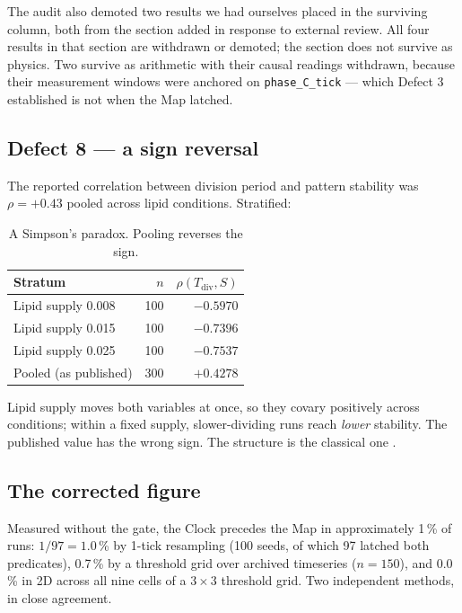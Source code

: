 \documentclass[11pt,letterpaper]{article}
\begin{document}
The audit also demoted two results we had ourselves placed in the
surviving column, both from the section added in response to external
review. All four results in that section are withdrawn or demoted; the
section does not survive as physics. Two survive as arithmetic with
their causal readings withdrawn, because their measurement windows were
anchored on \texttt{phase\_C\_tick} --- which Defect 3 established is not
when the Map latched.

\subsection{Defect 8 --- a sign reversal}

The reported correlation between division period and pattern stability
was $\rho = +0.43$ pooled across lipid conditions. Stratified:

\begin{table}[H]
\centering
\caption{A Simpson's paradox. Pooling reverses the sign.}
\label{tab:simpson}
\begin{tabular}{lrr}
\toprule
Stratum & $n$ & $\rho(T_{\mathrm{div}}, S)$ \\
\midrule
Lipid supply 0.008 & 100 & $-0.5970$ \\
Lipid supply 0.015 & 100 & $-0.7396$ \\
Lipid supply 0.025 & 100 & $-0.7537$ \\
\midrule
Pooled (as published) & 300 & $\mathbf{+0.4278}$ \\
\bottomrule
\end{tabular}
\end{table}

Lipid supply moves both variables at once, so they covary positively
across conditions; within a fixed supply, slower-dividing runs reach
\emph{lower} stability. The published value has the wrong sign. The
structure is the classical one \citep{simpson1951,blyth1972}.

\subsection{The corrected figure}

Measured without the gate, the Clock precedes the Map in approximately
1\,\% of runs: $1/97 = 1.0$\,\% by 1-tick resampling (100 seeds, of
which 97 latched both predicates), 0.7\,\% by a threshold grid over
archived timeseries ($n = 150$), and 0.0\,\% in 2D across all nine cells
of a $3 \times 3$ threshold grid. Two independent methods, in close
agreement.
\end{document}
